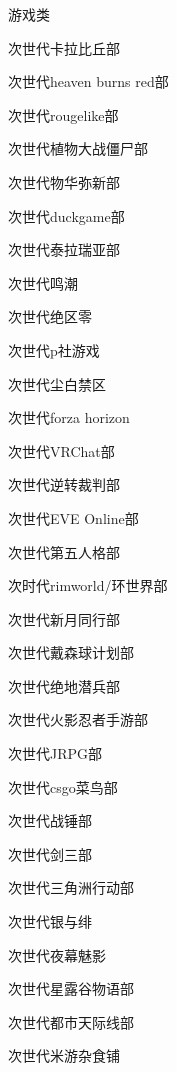 \begin{multicols}{3}
\begin{categorysection}{游戏类}
        \item 次世代卡拉比丘部
        \item 次世代heaven burns red部
        \item 次世代rougelike部
        \item 次世代植物大战僵尸部
        \item 次世代物华弥新部
        \item 次世代duckgame部
        \item 次世代泰拉瑞亚部
        \item 次世代鸣潮
        \item 次世代绝区零
        \item 次世代p社游戏
        \item 次世代尘白禁区
        \item 次世代forza horizon
        \item 次世代VRChat部
        \item 次世代逆转裁判部
        \item 次世代EVE Online部
        \item 次世代第五人格部
        \item 次时代rimworld/环世界部
        \item 次世代新月同行部
        \item 次世代戴森球计划部
        \item 次世代绝地潜兵部
        \item 次世代火影忍者手游部
        \item 次世代JRPG部
        \item 次世代csgo菜鸟部
        \item 次世代战锤部
        \item 次世代剑三部
        \item 次世代三角洲行动部
        \item 次世代银与绯
        \item 次世代夜幕魅影
        \item 次世代星露谷物语部
        \item 次世代都市天际线部
        \item 次世代米游杂食铺
    \end{categorysection}


\end{multicols}
